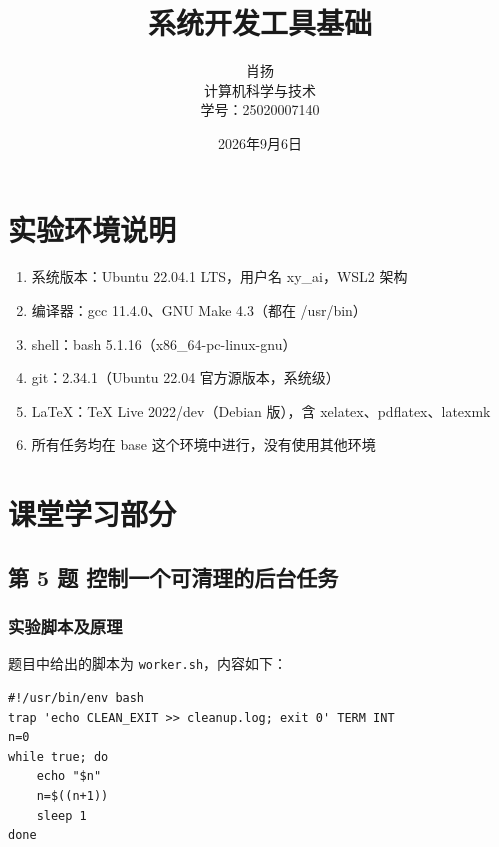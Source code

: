 \documentclass[a4paper,12pt]{report}
\begin{document}
\title{系统开发工具基础}
\author{肖扬\\计算机科学与技术\\学号：25020007140}
\date{2026年9月6日}
\maketitle

\tableofcontents
\newpage
{}

\color{red}\chapter{实验环境说明}\color{black}
\begin{enumerate}
  \item {\large 系统版本：Ubuntu 22.04.1 LTS，用户名 xy\_ai，WSL2 架构}
  \item {\large 编译器：gcc 11.4.0、GNU Make 4.3（都在 /usr/bin）}
  \item {\large shell：bash 5.1.16（x86\_64-pc-linux-gnu）}
  \item {\large git：2.34.1（Ubuntu 22.04 官方源版本，系统级）}
  \item {\large LaTeX：TeX Live 2022/dev（Debian 版），含 xelatex、pdflatex、latexmk}
  \item {\large 所有任务均在 base 这个环境中进行，没有使用其他环境}
\end{enumerate}

\color{red}\chapter{课堂学习部分}\color{black}

\section{第 5 题 控制一个可清理的后台任务}

\subsection{实验脚本及原理}

题目中给出的脚本为 \texttt{worker.sh}，内容如下：

\begin{lstlisting}[basicstyle=\ttfamily\footnotesize]
#!/usr/bin/env bash
trap 'echo CLEAN_EXIT >> cleanup.log; exit 0' TERM INT
n=0
while true; do
    echo "$n"
    n=$((n+1))
    sleep 1
done
\end{lstlisting}
\end{document}
